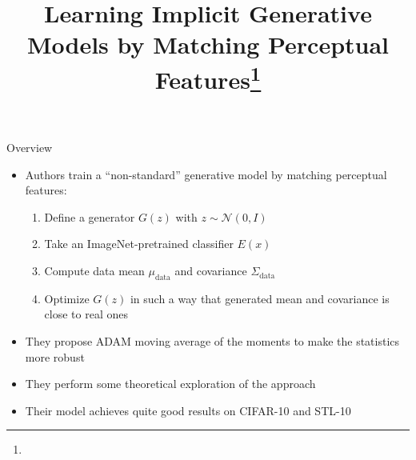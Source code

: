\documentclass[handout, 10pt]{beamer}
\title{Learning Implicit Generative Models by Matching Perceptual Features\footnote{\citepaper{GFMN}}}
\begin{document}
\begin{frame}
    \titlepage
\end{frame}

\begin{frame}{Overview}
    \begin{itemize}
        \item\pause Authors train a ``non-standard'' generative model by matching perceptual features:
        \begin{enumerate}
            \item\pause Define a generator $G(z)$ with $z \sim \mathcal{N}(0, I)$
            \item\pause Take an ImageNet-pretrained classifier $E(x)$
            \item\pause Compute data mean $\mu_\text{data}$ and covariance $\Sigma_\text{data}$
            \item\pause Optimize $G(z)$ in such a way that generated mean and covariance is close to real ones
        \end{enumerate}
        \item\pause They propose ADAM moving average of the moments to make the statistics more robust
        \item\pause They perform some theoretical exploration of the approach
        \item\pause Their model achieves quite good results on CIFAR-10 and STL-10
    \end{itemize}
\end{frame}
\end{document}
